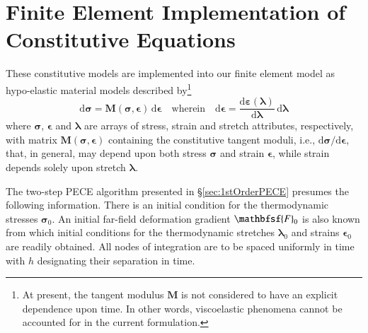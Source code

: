 \section{Finite Element Implementation of Constitutive Equations}
\label{secFE_CE}

These constitutive models are implemented into our finite element model as hypo-elastic material models \cite{Truesdell55} described by\footnote{
    At present, the tangent modulus $\mathbf{M}$ is not considered to have an explicit dependence upon time.  In other words, visco\-elastic phenomena cannot be accounted for in the current formulation.
}
\begin{equation}
\mathrm{d} \boldsymbol{\sigma} = \mathbf{M} ( \boldsymbol{\sigma}, \boldsymbol{\epsilon} ) \, \mathrm{d} \boldsymbol{\epsilon} 
\quad \text{wherein} \quad
\mathrm{d} \boldsymbol{\epsilon} = 
\frac{\mathrm{d} \boldsymbol{\varepsilon} ( \boldsymbol{\lambda} )}
{\mathrm{d} \boldsymbol{\lambda}} \, \mathrm{d} \boldsymbol{\lambda}
\label{hypoelastic}
\end{equation}
where $\boldsymbol{\sigma}$, $\boldsymbol{\epsilon}$ and $\boldsymbol{\lambda}$ are arrays of stress, strain and stretch attributes, respectively, with matrix $\mathbf{M} ( \boldsymbol{\sigma}, \boldsymbol{\epsilon} )$ containing the constitutive tangent moduli, i.e., $\mathrm{d} \boldsymbol{\sigma} / \mathrm{d} \boldsymbol{\epsilon}$, that, in general, may depend upon both stress $\boldsymbol{\sigma}$ and strain $\boldsymbol{\epsilon}$, while strain depends solely upon stretch $\boldsymbol{\lambda}$. 

The two-step PECE algorithm presented in \S\ref{sec:1stOrderPECE} presumes the following information.  There is an initial condition for the thermo\-dynamic stresses $\boldsymbol{\sigma}_0$.  An initial far-field deformation gradient $\mathbfsf{F}_0$ is also known from which initial conditions for the thermo\-dynamic stretches $\boldsymbol{\lambda}_0$ and strains $\boldsymbol{\epsilon}_0$ are readily obtained.  All nodes of integration are to be spaced uniformly in time with $h$ designating their separation in time.  

